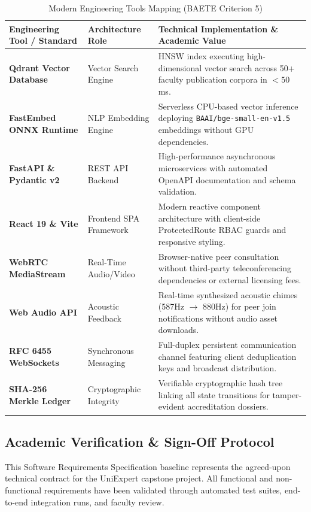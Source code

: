 \documentclass[10.5pt,a4paper]{article}
\begin{document}
\begin{table}[h]
\centering
\small
\begin{tabularx}{\linewidth}{|l|l|X|}
\hline
\rowcolor{headergray} \textbf{Engineering Tool / Standard} & \textbf{Architecture Role} & \textbf{Technical Implementation \& Academic Value} \\ \hline
\textbf{Qdrant Vector Database} & Vector Search Engine & HNSW index executing high-dimensional vector search across 50+ faculty publication corpora in $< 50$ms. \\ \hline
\textbf{FastEmbed ONNX Runtime} & NLP Embedding Engine & Serverless CPU-based vector inference deploying \texttt{BAAI/bge-small-en-v1.5} embeddings without GPU dependencies. \\ \hline
\textbf{FastAPI \& Pydantic v2} & REST API Backend & High-performance asynchronous microservices with automated OpenAPI documentation and schema validation. \\ \hline
\textbf{React 19 \& Vite} & Frontend SPA Framework & Modern reactive component architecture with client-side ProtectedRoute RBAC guards and responsive styling. \\ \hline
\textbf{WebRTC MediaStream} & Real-Time Audio/Video & Browser-native peer consultation without third-party teleconferencing dependencies or external licensing fees. \\ \hline
\textbf{Web Audio API} & Acoustic Feedback & Real-time synthesized acoustic chimes (587Hz $\rightarrow$ 880Hz) for peer join notifications without audio asset downloads. \\ \hline
\textbf{RFC 6455 WebSockets} & Synchronous Messaging & Full-duplex persistent communication channel featuring client deduplication keys and broadcast distribution. \\ \hline
\textbf{SHA-256 Merkle Ledger} & Cryptographic Integrity & Verifiable cryptographic hash tree linking all state transitions for tamper-evident accreditation dossiers. \\ \hline
\end{tabularx}
\caption{Modern Engineering Tools Mapping (BAETE Criterion 5)}
\end{table}

\subsection{Academic Verification \& Sign-Off Protocol}
This Software Requirements Specification baseline represents the agreed-upon technical contract for the UniExpert capstone project. All functional and non-functional requirements have been validated through automated test suites, end-to-end integration runs, and faculty review.
\end{document}
